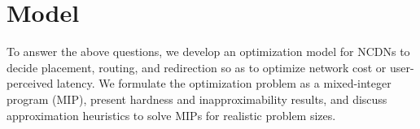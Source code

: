 


\section{Model}





To answer the above questions, we develop an optimization model for NCDNs to decide placement, routing, and redirection so as to optimize network cost or user-perceived latency. We formulate the optimization problem as a mixed-integer program (MIP), present hardness and inapproximability results, and discuss approximation heuristics to solve MIPs for realistic problem sizes.










